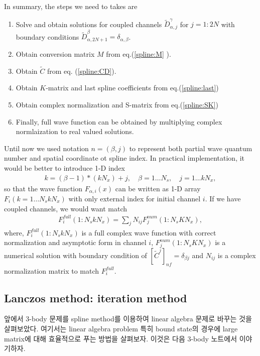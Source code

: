 \documentclass[10pt]{article}
\newcommand{\bea}{\begin{eqnarray}}
\newcommand{\eea}{\end{eqnarray}}
\begin{document}
In summary, the steps we need to takes are
\begin{enumerate}
\item Solve and obtain solutions for coupled channels
      $\tilde{D}^\gamma_{\alpha, j}$ for $j=1:2N$ 
      with boundary conditions
      $\tilde{D}^\beta_{\alpha,2N+1}= \delta_{\alpha,\beta}$. 

\item Obtain conversion matrix $M$ from eq.(\ref{spline:M} ).

\item Obtain $\tilde{C}$ from eq. (\ref{spline:CD}).

\item Obtain $K$-matrix and last spline coefficients from eq.(\ref{spline:last})

\item Obtain complex normalization and S-matrix from eq.(\ref{spline:SK})

\item Finally, full wave function can be obtained 
      by multiplying complex normlaization to real valued solutions. 
 
\end{enumerate}

Until now we used notation $n=(\beta,j)$ 
to represent both partial wave quantum number and
spatial coordinate ot spline index. In practical implementation, it would be better
to introduce 1-D index
\bea 
k=(\beta-1)*(k N_x)+j, \quad \beta=1\dots N_s,\quad j=1\dots k N_x,
\eea 
so that the wave function $F_{\alpha,i}(x)$ can be written as 1-D array
$F_i(k=1\dots N_s k N_x)$ with only external index for initial channel $i$.
If we have coupled channels, we would want match 
\bea 
F^{full}_i(1:N_s k N_x)=\sum_j N_{ij} F^{num}_{j}(1:N_s K N_x),
\eea   
where, $F^{full}_i(1:N_s k N_x)$ is a full complex wave function with correct 
normalization and asymptotic form in channel $i$,
$F^{num}_{j}(1:N_s K N_x)$ is a numerical solution with boundary 
condition of $[\tilde{C}^j]_{nf}=\delta_{\beta j}$ and $N_{ij}$
is a complex normalization matrix to match $F^{full}_i$. 


\subsection{Lanczos method: iteration method}
앞에서 3-body 문제를 spline method를 이용하여
linear algebra 문제로 바꾸는 것을 살펴보았다.
여기서는 linear algebra problem 특히 bound state의 경우에
large matrix에 대해 효율적으로 푸는 방법을 살펴보자. 이것은 다음 3-body 노트에서 이야기하자.
\end{document}
